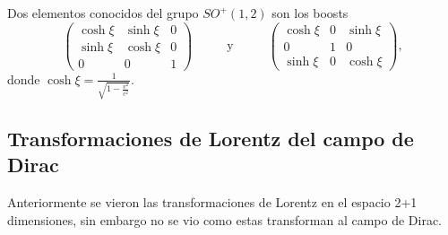 Dos elementos conocidos del grupo $SO^+(1,2)$ son los boosts
\begin{equation}
	\begin{pmatrix}
		\cosh\xi & \sinh\xi & 0 \\
		\sinh\xi & \cosh\xi & 0 \\
		0        & 0        & 1
	\end{pmatrix} \hspace{1cm}\text{ y }\hspace{1cm}\begin{pmatrix}
		\cosh\xi & 0 & \sinh\xi \\
		0        & 1 & 0        \\
		\sinh\xi & 0 & \cosh\xi
	\end{pmatrix},
\end{equation}
donde $\cosh\xi= \frac{1}{\sqrt{1-\frac{v^2}{c^2}}}$.
\subsection{Transformaciones de Lorentz del campo de Dirac}
Anteriormente se vieron las transformaciones de Lorentz en el espacio 2+1 dimensiones, sin embargo no se vio como estas transforman al campo de Dirac.

